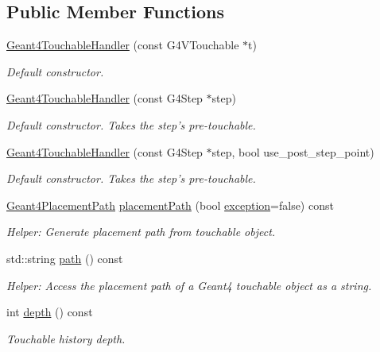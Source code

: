 \subsection*{Public Member Functions}
\begin{DoxyCompactItemize}
\item 
\hyperlink{class_d_d4hep_1_1_simulation_1_1_geant4_touchable_handler_a94190007b2cfab9cab06a0de576cc23f}{Geant4TouchableHandler} (const G4VTouchable $\ast$t)
\begin{DoxyCompactList}\small\item\em Default constructor. \item\end{DoxyCompactList}\item 
\hyperlink{class_d_d4hep_1_1_simulation_1_1_geant4_touchable_handler_af2bd4df9a960cd1093e18204c8097b39}{Geant4TouchableHandler} (const G4Step $\ast$step)
\begin{DoxyCompactList}\small\item\em Default constructor. Takes the step's pre-\/touchable. \item\end{DoxyCompactList}\item 
\hyperlink{class_d_d4hep_1_1_simulation_1_1_geant4_touchable_handler_ac4e6b8879c60c24faac7389def633092}{Geant4TouchableHandler} (const G4Step $\ast$step, bool use\_\-post\_\-step\_\-point)
\begin{DoxyCompactList}\small\item\em Default constructor. Takes the step's pre-\/touchable. \item\end{DoxyCompactList}\item 
\hyperlink{class_d_d4hep_1_1_simulation_1_1_geant4_touchable_handler_a3ba887af055edecb3e6cfb04f2c7dc2c}{Geant4PlacementPath} \hyperlink{class_d_d4hep_1_1_simulation_1_1_geant4_touchable_handler_a427aa0875c440d5c07bb18081072eea3}{placementPath} (bool \hyperlink{classstd_1_1exception}{exception}=false) const 
\begin{DoxyCompactList}\small\item\em Helper: Generate placement path from touchable object. \item\end{DoxyCompactList}\item 
std::string \hyperlink{class_d_d4hep_1_1_simulation_1_1_geant4_touchable_handler_a2cc01ed8301f7f2df0cd9e5f5b6142ea}{path} () const 
\begin{DoxyCompactList}\small\item\em Helper: Access the placement path of a Geant4 touchable object as a string. \item\end{DoxyCompactList}\item 
int \hyperlink{class_d_d4hep_1_1_simulation_1_1_geant4_touchable_handler_ab82d307aaa98dfd0f5c775c8f99d90ea}{depth} () const 
\begin{DoxyCompactList}\small\item\em Touchable history depth. \item\end{DoxyCompactList}\end{DoxyCompactItemize}
